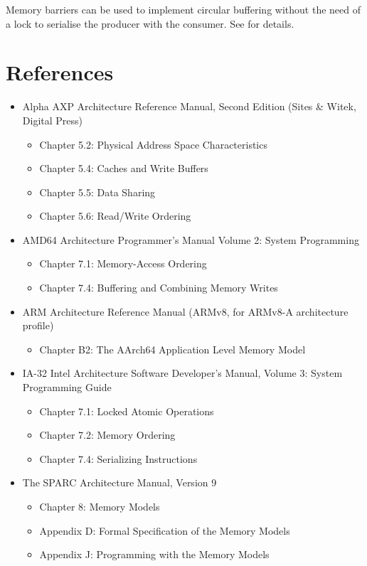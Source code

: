 Memory barriers can be used to implement circular buffering without the need
of a lock to serialise the producer with the consumer.
See  for details.


\section{References}

\footnotesize
\begin{itemize}
\item
Alpha AXP Architecture Reference Manual, Second Edition (Sites \& Witek,
Digital Press)
  \begin{itemize}
    \item
	Chapter 5.2: Physical Address Space Characteristics
    \item
	Chapter 5.4: Caches and Write Buffers
    \item
	Chapter 5.5: Data Sharing
    \item
	Chapter 5.6: Read/Write Ordering
  \end{itemize}

\item
AMD64 Architecture Programmer's Manual Volume 2: System Programming
  \begin{itemize}
    \item
	Chapter 7.1: Memory-Access Ordering
    \item
	Chapter 7.4: Buffering and Combining Memory Writes
  \end{itemize}
       
\item
ARM Architecture Reference Manual (ARMv8, for ARMv8-A architecture profile)
  \begin{itemize}
    \item
	Chapter B2: The AArch64 Application Level Memory Model
  \end{itemize}

\item
IA-32 Intel Architecture Software Developer's Manual, Volume 3:
System Programming Guide
  \begin{itemize}
    \item
	Chapter 7.1: Locked Atomic Operations
    \item
	Chapter 7.2: Memory Ordering
    \item
	Chapter 7.4: Serializing Instructions
  \end{itemize}

\item
The SPARC Architecture Manual, Version 9
  \begin{itemize}
    \item
	Chapter 8: Memory Models
    \item
	Appendix D: Formal Specification of the Memory Models
    \item
	Appendix J: Programming with the Memory Models
  \end{itemize}


\end{itemize}
